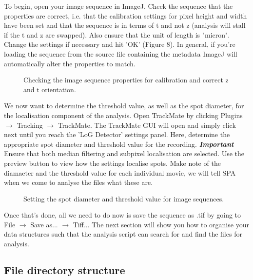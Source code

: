 \documentclass[11pt]{article} %
\begin{document}
To begin, open your image sequence in ImageJ. Check the sequence that the properties are correct, i.e. that the calibration settings for pixel height and width have been set and that the sequence is in terms of t and not z (analysis will stall if the t and z are swapped). Also ensure that the unit of length is "micron". Change the settings if necessary and hit 'OK' (Figure 8). In general, if you're loading the sequence from the source file containing the metadata ImageJ will automatically alter the properties to match.\\

	\begin{figure}[H]
	\caption{Checking the image sequence properties for calibration and correct z and t orientation.}
	\end{figure}
	
We now want to determine the threshold value, as well as the spot diameter, for the localisation component of the analysis. Open TrackMate by clicking Plugins $\rightarrow$ Tracking $\rightarrow$ TrackMate. The TrackMate GUI will open and simply click next until you reach the 'LoG Detector' settings panel. Here, determine the appropriate spot diameter and threshold value for the recording. \textit{\textbf{Important}} Ensure that both median filtering and subpixel localisation are selected. Use the preview button to view how the settings localise spots. Make note of the diamaeter and the threshold value for each individual movie, we will tell SPA when we come to analyse the files what these are.

	\begin{figure}[H]
	\caption{Setting the spot diameter and threshold value for image sequences.}
	\end{figure}

Once that's done, all we need to do now is save the sequence as .tif by going to File $\rightarrow$ Save as... $\rightarrow$ Tiff... The next section will show you how to organise your data structures such that the analysis script can search for and find the files for analysis.

\subsection{File directory structure}
\end{document}
